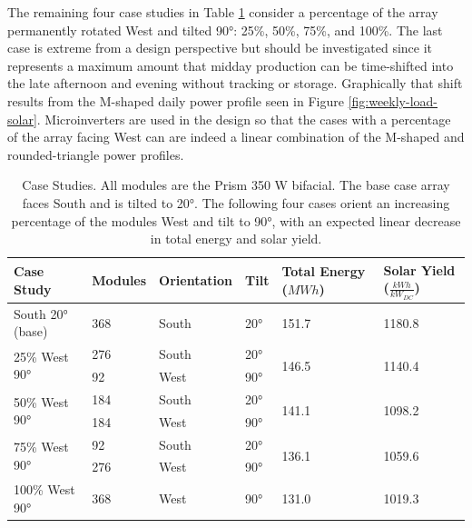 \documentclass[journal,article,submit,pdftex,moreauthors]{Definitions/mdpi}
\begin{document}
The remaining four case studies in Table \ref{tab:casestudies} consider a percentage of the array permanently rotated West and tilted 90°: 25\%, 50\%, 75\%, and 100\%. The last case is extreme from a design perspective but should be investigated since it represents a maximum amount that midday production can be time-shifted into the late afternoon and evening without tracking or storage. Graphically that shift results from the M-shaped daily power profile seen in Figure \ref{fig:weekly-load-solar}. Microinverters are used in the design so that the cases with a percentage of the array facing West can are indeed a linear combination of the M-shaped and rounded-triangle power profiles.

\begin{table}
  \centering
  \caption{Case Studies. All modules are the Prism 350 W bifacial. The base case array faces South and is tilted to 20°. The following four cases orient an increasing percentage of the modules West and tilt to 90°, with an expected linear decrease in total energy and solar yield.}
  \label{tab:casestudies}
  \begin{tabularx}{\textwidth}{XXXXXX}
    \toprule
    Case Study                     & Modules & Orientation & Tilt & Total Energy ($MWh$)   & Solar Yield ($\frac{kWh}{kW_{DC}}$) \\
    \midrule
    South 20° (base)               & 368     & South       & 20°  & 151.7                  & 1180.8                              \\
    \hline
    \multirow{2}{*}{25\% West 90°} & 276     & South       & 20°  & \multirow{2}{*}{146.5} & \multirow{2}{*}{1140.4}             \\
                                   & 92      & West        & 90°  &                        &                                     \\
    \hline
    \multirow{2}{*}{50\% West 90°} & 184     & South       & 20°  & \multirow{2}{*}{141.1} & \multirow{2}{*}{1098.2}             \\
                                   & 184     & West        & 90°  &                        &                                     \\
    \hline
    \multirow{2}{*}{75\% West 90°} & 92      & South       & 20°  & \multirow{2}{*}{136.1} & \multirow{2}{*}{1059.6}             \\
                                   & 276     & West        & 90°  &                        &                                     \\
    \hline
    100\% West 90°                 & 368     & West        & 90°  & 131.0                  & 1019.3                              \\
    \bottomrule
  \end{tabularx}
\end{table}
\end{document}
